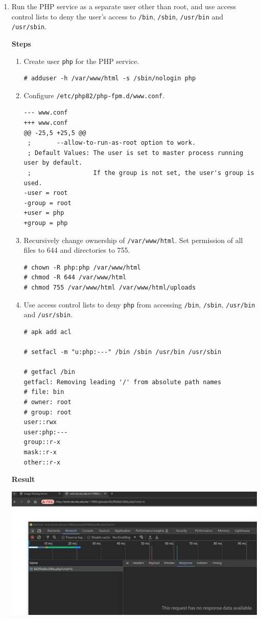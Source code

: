 \documentclass[12pt, a4paper]{article}
\begin{document}
\begin{enumerate}[label=(\alph*)]
    \pagebreak
    \item Run the PHP service as a separate user other than root, and use access
    control lists to deny the user's access to \verb|/bin|, \verb|/sbin|,
    \verb|/usr/bin| and \verb|/usr/sbin|.

    \textbf{Steps}
    \begin{enumerate}[label=(\arabic*)]
      \item Create user \verb|php| for the PHP service.
      \begin{Verbatim}[frame=single]
# adduser -h /var/www/html -s /sbin/nologin php
      \end{Verbatim}
      \item Configure \verb|/etc/php82/php-fpm.d/www.conf|.
      \begin{verbatim}
--- www.conf
+++ www.conf
@@ -25,5 +25,5 @@
 ;       --allow-to-run-as-root option to work.
 ; Default Values: The user is set to master process running user by default.
 ;                 If the group is not set, the user's group is used.
-user = root
-group = root
+user = php
+group = php
      \end{verbatim}
      \item Recursively change ownership of \verb|/var/www/html|. Set permission
      of all files to 644 and directories to 755.
      \begin{Verbatim}[frame=single]
# chown -R php:php /var/www/html
# chmod -R 644 /var/www/html
# chmod 755 /var/www/html /var/www/html/uploads
      \end{Verbatim}
      \item Use access control lists to deny \verb|php| from accessing \verb|/bin|,
      \verb|/sbin|, \verb|/usr/bin| and \verb|/usr/sbin|.
      \begin{Verbatim}[frame=single]
# apk add acl

# setfacl -m "u:php:---" /bin /sbin /usr/bin /usr/sbin

# getfacl /bin
getfacl: Removing leading '/' from absolute path names
# file: bin
# owner: root
# group: root
user::rwx
user:php:---
group::r-x
mask::r-x
other::r-x
      \end{Verbatim}
    \end{enumerate}

    \pagebreak
    \textbf{Result}

    \includegraphics[width=\linewidth]{2-g_result.png}


\end{enumerate}
\end{document}

